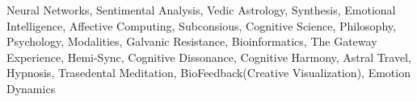 Neural Networks, Sentimental Analysis, Vedic Astrology, Synthesis, Emotional Intelligence, Affective Computing, Subconsious, Cognitive Science, Philosophy, Psychology, Modalities, Galvanic Resistance, Bioinformatics, The Gateway Experience, Hemi-Sync, Cognitive Dissonance, Cognitive Harmony, Astral Travel, Hypnosis, Trasedental Meditation, BioFeedback(Creative Visualization), Emotion Dynamics